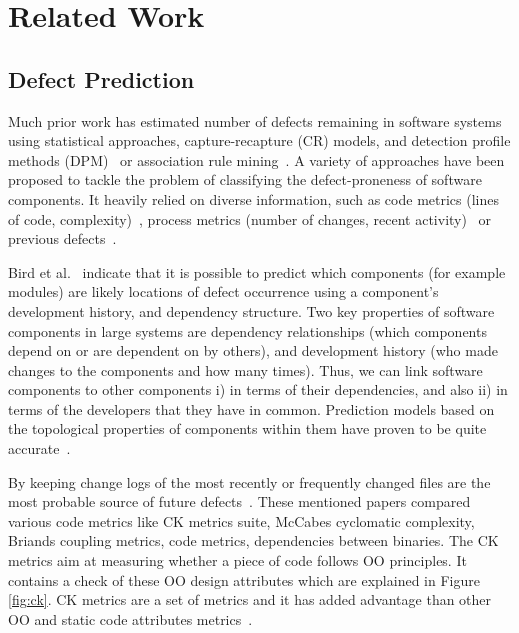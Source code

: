 \documentclass[sigconf,review, anonymous]{acmart}
\theoremstyle{break}
\theoremstyle{break}
\begin{document}
\section{Related Work}
\subsection{Defect Prediction}
\label{sect:review}

Much prior work has estimated number of defects remaining in software systems~\cite{hall2012systematic} using statistical approaches, capture-recapture 
(CR) models, and detection profile methods (DPM)~\cite{song2011general} or
association rule mining~\cite{song2006software}. A variety of approaches have been proposed to tackle the problem of classifying the defect-proneness of software components. It heavily relied on diverse information, such as code metrics (lines of code, complexity)~\cite{d2010extensive,menzies2007data, nagappan2006mining,shepperd2014researcher,Menzies2010}, process metrics (number of changes, recent activity)~\cite{hassan2009predicting} or previous defects~\cite{kim2007predicting}.

Bird et al.~\cite{bird2009putting} indicate that it is possible to predict which components (for example modules) are likely locations of
defect occurrence using a component's development history,
and dependency structure. Two key properties of software components
in large systems are dependency relationships (which components
depend on or are dependent on by others), and development
history (who made changes to the components and
how many times). Thus, we can link software components
to other components i) in terms of their dependencies, and
also ii) in terms of the developers that they have in common. Prediction models based on the topological properties
of components within them have proven to be quite
accurate~\cite{zimmermann2008predicting}.

By keeping change logs of the most recently or frequently changed files are the most probable source of future defects~\cite{hall2012systematic, catal2009systematic}. These mentioned papers compared various code metrics like CK  metrics  suite,  
McCabes  cyclomatic  complexity, Briands coupling metrics, code metrics, 
dependencies between  binaries. The CK metrics aim at measuring whether a 
piece of code follows OO principles. It contains a check of these OO design 
attributes which are explained in Figure \ref{fig:ck}. CK metrics are a set
of metrics and it has added advantage than other OO and static code attributes metrics~\cite{d2010extensive}. 
\end{document}
